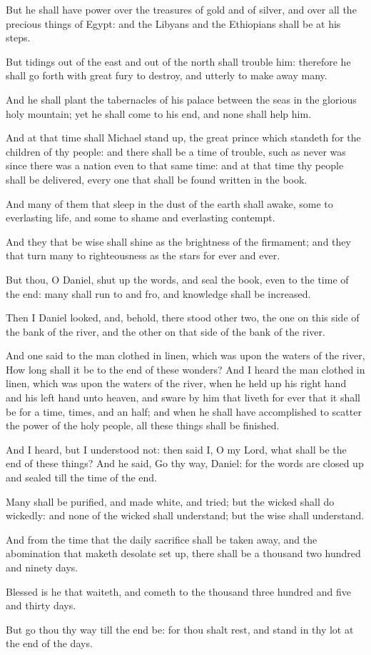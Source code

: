 \Verse But he shall have power over the treasures of gold and of silver, and over all the precious things of Egypt: and the Libyans and the Ethiopians shall be at his steps.

\Verse But tidings out of the east and out of the north shall trouble him: therefore he shall go forth with great fury to destroy, and utterly to make away many.

\Verse And he shall plant the tabernacles of his palace between the seas in the glorious holy mountain; yet he shall come to his end, and none shall help him.


\Chapter
\Verse And at that time shall Michael stand up, the great prince which standeth for the children of thy people: and there shall be a time of trouble, such as never was since there was a nation even to that same time: and at that time thy people shall be delivered, every one that shall be found written in the book.

\Verse And many of them that sleep in the dust of the earth shall awake, some to everlasting life, and some to shame and everlasting contempt.

\Verse And they that be wise shall shine as the brightness of the firmament; and they that turn many to righteousness as the stars for ever and ever.

\Verse But thou, O Daniel, shut up the words, and seal the book, even to the time of the end: many shall run to and fro, and knowledge shall be increased.

\Verse Then I Daniel looked, and, behold, there stood other two, the one on this side of the bank of the river, and the other on that side of the bank of the river.

\Verse And one said to the man clothed in linen, which was upon the waters of the river, How long shall it be to the end of these wonders?  \Verse And I heard the man clothed in linen, which was upon the waters of the river, when he held up his right hand and his left hand unto heaven, and sware by him that liveth for ever that it shall be for a time, times, and an half; and when he shall have accomplished to scatter the power of the holy people, all these things shall be finished.

\Verse And I heard, but I understood not: then said I, O my Lord, what shall be the end of these things?  \Verse And he said, Go thy way, Daniel: for the words are closed up and sealed till the time of the end.

\Verse Many shall be purified, and made white, and tried; but the wicked shall do wickedly: and none of the wicked shall understand; but the wise shall understand.

\Verse And from the time that the daily sacrifice shall be taken away, and the abomination that maketh desolate set up, there shall be a thousand two hundred and ninety days.

\Verse Blessed is he that waiteth, and cometh to the thousand three hundred and five and thirty days.

\Verse But go thou thy way till the end be: for thou shalt rest, and stand in thy lot at the end of the days.

